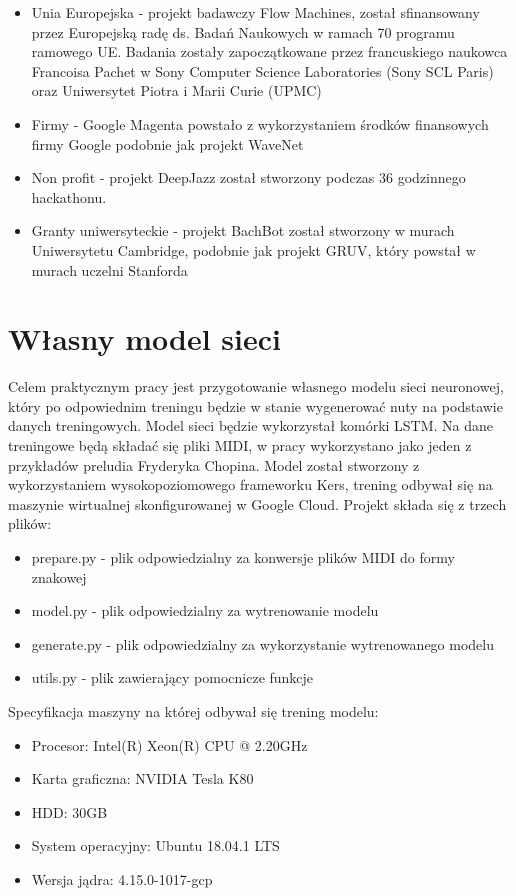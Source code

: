 	\begin{itemize}
		\item Unia Europejska - projekt badawczy Flow Machines, został sfinansowany przez Europejską radę ds. Badań Naukowych w ramach 70 programu ramowego UE. Badania zostały zapoczątkowane przez francuskiego naukowca Francoisa Pachet w Sony Computer Science Laboratories (Sony SCL Paris) oraz Uniwersytet Piotra i Marii Curie (UPMC)
		\item Firmy - Google Magenta powstało z wykorzystaniem środków finansowych firmy Google podobnie jak projekt WaveNet
		\item Non profit - projekt DeepJazz został stworzony podczas 36 godzinnego hackathonu.
		\item Granty uniwersyteckie - projekt BachBot został stworzony w murach Uniwersytetu Cambridge, podobnie jak projekt GRUV, który powstał w murach uczelni Stanforda
	\end{itemize}
	
	\section{Własny model sieci}
	
	Celem praktycznym pracy jest przygotowanie własnego modelu sieci neuronowej, który po odpowiednim treningu będzie w stanie wygenerować nuty na podstawie danych treningowych. Model sieci będzie wykorzystał komórki LSTM. Na dane treningowe będą składać się pliki MIDI, w pracy wykorzystano jako jeden z przykładów preludia Fryderyka Chopina. Model został stworzony z wykorzystaniem wysokopoziomowego frameworku Kers, trening odbywał się na maszynie wirtualnej skonfigurowanej w Google Cloud. Projekt składa się z trzech plików:
	
	\begin{itemize}
		\item prepare.py - plik odpowiedzialny za konwersje plików MIDI do formy znakowej
		\item model.py - plik odpowiedzialny za wytrenowanie modelu
		\item generate.py - plik odpowiedzialny za wykorzystanie wytrenowanego modelu
		\item utils.py - plik zawierający pomocnicze funkcje
	\end{itemize}

	Specyfikacja maszyny na której odbywał się trening modelu:
	
	\begin{itemize}
		\item Procesor: Intel(R) Xeon(R) CPU @ 2.20GHz
		\item Karta graficzna: NVIDIA Tesla K80
		\item HDD: 30GB
		\item System operacyjny: Ubuntu 18.04.1 LTS 
		\item Wersja jądra: 4.15.0-1017-gcp
	\end{itemize}

